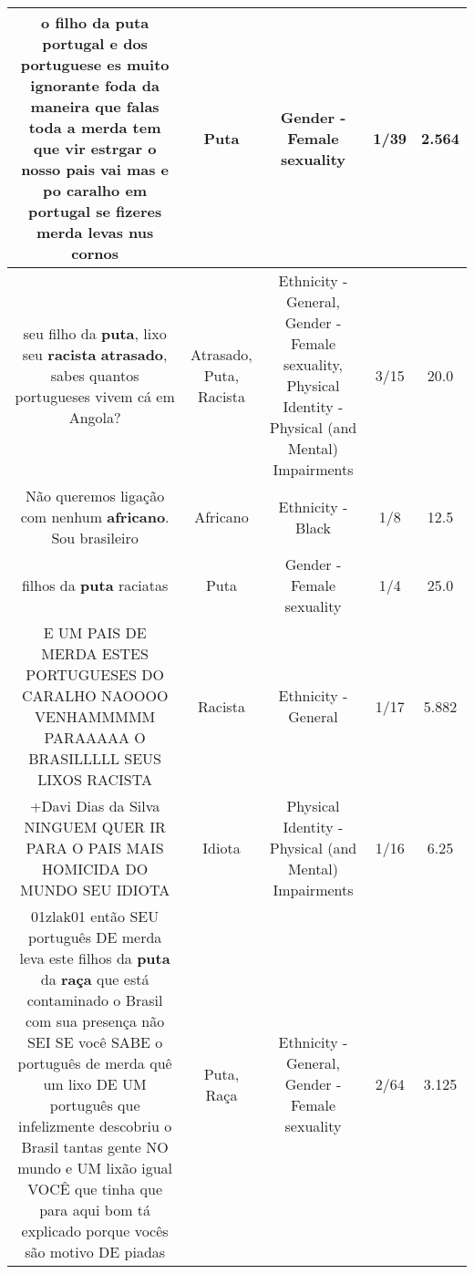 \documentclass[11pt]{article}
\newlength\mylength
\begin{document}
\begin{center}
\begin{longtable}{|C{.65\mylength}|C{.30\mylength}|C{.12\mylength}|C{.12\mylength}|C{.12\mylength}|}
  \small o filho da \textbf{puta} portugal e dos portuguese  es muito ignorante foda da maneira que falas toda a merda tem que vir estrgar o nosso pais vai mas e po caralho em portugal se fizeres merda levas nus cornos\normalsize   & Puta & Gender - Female sexuality & 1/39 & 2.564 \\  \hline
  \small seu filho da \textbf{puta}, lixo seu \textbf{racista} \textbf{atrasado}, sabes quantos portugueses vivem cá em Angola?\normalsize   & Atrasado, Puta, Racista & Ethnicity - General, Gender - Female sexuality, Physical Identity - Physical (and Mental) Impairments & 3/15 & 20.0 \\  \hline
  \small Não queremos ligação com nenhum \textbf{africano}. Sou brasileiro\normalsize   & Africano & Ethnicity - Black & 1/8 & 12.5 \\  \hline
  \small filhos da \textbf{puta} raciatas\normalsize   & Puta & Gender - Female sexuality & 1/4 & 25.0 \\  \hline
  \small E UM PAIS DE MERDA ESTES PORTUGUESES DO CARALHO NAOOOO VENHAMMMMM PARAAAAA O BRASILLLLL SEUS LIXOS RACISTA\normalsize   & Racista & Ethnicity - General & 1/17 & 5.882 \\  \hline
  \small +Davi Dias da Silva NINGUEM QUER IR PARA O PAIS MAIS HOMICIDA DO MUNDO SEU IDIOTA\normalsize   & Idiota & Physical Identity - Physical (and Mental) Impairments & 1/16 & 6.25 \\  \hline
  \small \@01zlak01 então SEU português DE merda leva este filhos da \textbf{puta} da \textbf{raça} que está contaminado o Brasil com sua presença não SEI SE você SABE o português de merda quê um lixo DE UM português que infelizmente descobriu o Brasil tantas gente NO mundo e UM lixão igual VOCÊ que tinha que para aqui bom tá explicado porque vocês são motivo DE piadas\normalsize   & Puta, Raça & Ethnicity - General, Gender - Female sexuality & 2/64 & 3.125 \\  \hline

\end{longtable}
\end{center}
\end{document}
